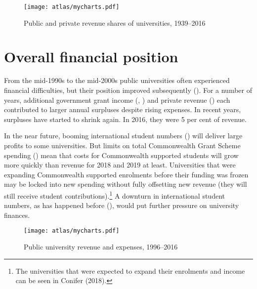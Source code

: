 \documentclass{grattan}
\begin{document}
    \begin{figure} %
    \caption{Public and private revenue shares of universities, 1939--2016}\label{fig:public-and-private-revenue-shares-of-universities-19392016}
    \units{}
    \texttt{[image: atlas/mycharts.pdf]}
    \end{figure}


%
\section{Overall financial position }\label{sec:overall-financial-position}

From the mid-1990s to the mid-2000s public universities often experienced financial difficulties, but their position improved subsequently (). For a number of years, additional government grant income (, ) and private revenue () each contributed to larger annual surpluses despite rising expenses. In recent years, surpluses have started to shrink again. In 2016, they were 5 per cent of revenue.

In the near future, booming international student numbers () will deliver large profits to some universities. But limits on total Commonwealth Grant Scheme spending () mean that costs for Commonwealth supported students will grow more quickly than revenue for 2018 and 2019 at least. Universities that were expanding Commonwealth supported enrolments before their funding was frozen may be locked into new spending without fully offsetting new revenue (they will still receive student contributions).\footnote{The universities that were expected to expand their enrolments and income can be seen in Conifer (2018).} A downturn in international student numbers, as has happened before (), would put further pressure on university finances.


    \begin{figure} %
    \caption{Public university revenue and expenses, 1996--2016}\label{fig:public-university-revenue-and-expenses-19962016}
    \texttt{[image: atlas/mycharts.pdf]}
    \end{figure}
\end{document}
